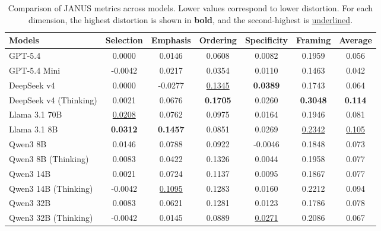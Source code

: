 \documentclass[11pt]{article}
\begin{document}
\begin{table}[t]
\centering
\small
\begin{tabular}{lcccccc}
\toprule
Models & Selection & Emphasis & Ordering & Specificity & Framing &  Average \\
\midrule
GPT-5.4 & 0.0000 & 0.0146 & \cellcolor{janusTeal!40}0.0608 & 0.0082 & \cellcolor{janusTeal!45}0.1959 & 0.056 \\
GPT-5.4 Mini & -0.0042 & 0.0217 & 0.0354 & 0.0110 & \cellcolor{janusTeal!45}0.1463 & 0.042 \\
\midrule
DeepSeek v4 & 0.0000 & -0.0277 & \cellcolor{janusTeal!45}\underline{0.1345} & \cellcolor{janusTeal!38}\textbf{0.0389} & \cellcolor{janusTeal!45}0.1743 & 0.064 \\
DeepSeek v4 (Thinking) & 0.0021 & \cellcolor{janusTeal!35}0.0676 & \cellcolor{janusTeal!45}\textbf{0.1705} & \cellcolor{janusTeal!14}0.0260 & \cellcolor{janusTeal!45}\textbf{0.3048} & \textbf{0.114} \\

\midrule
Llama 3.1 70B & \underline{0.0208} & \cellcolor{janusTeal!45}0.0762 & \cellcolor{janusTeal!45}0.0975 & 0.0164 & \cellcolor{janusTeal!45}0.1946 & 0.081 \\
Llama 3.1 8B & \cellcolor{janusTeal!26}\textbf{0.0312} & \cellcolor{janusTeal!45}\textbf{0.1457} & \cellcolor{janusTeal!45}0.0851 & 0.0269 & \cellcolor{janusTeal!45}\underline{0.2342} & \underline{0.105} \\
\midrule
Qwen3 8B & 0.0146 & \cellcolor{janusTeal!43}0.0788 & \cellcolor{janusTeal!45}0.0922 & -0.0046 & \cellcolor{janusTeal!45}0.1848 & 0.073 \\
Qwen3 8B (Thinking) & 0.0083 & 0.0422 & \cellcolor{janusTeal!45}0.1326 & 0.0044 & \cellcolor{janusTeal!45}0.1958 & 0.077 \\
Qwen3 14B & 0.0021 & \cellcolor{janusTeal!45}0.0724 & \cellcolor{janusTeal!45}0.1137 & 0.0095 & \cellcolor{janusTeal!45}0.1867 & 0.077 \\
Qwen3 14B (Thinking) & -0.0042 & \cellcolor{janusTeal!45}\underline{0.1095} & \cellcolor{janusTeal!45}0.1283 & 0.0160 & \cellcolor{janusTeal!45}0.2212 & 0.094 \\
Qwen3 32B & 0.0083 & \cellcolor{janusTeal!43}0.0621 & \cellcolor{janusTeal!45}0.1281 & 0.0123 & \cellcolor{janusTeal!45}0.1786 & 0.078 \\
Qwen3 32B (Thinking) & -0.0042 & 0.0145 & \cellcolor{janusTeal!45}0.0889 & \underline{0.0271} & \cellcolor{janusTeal!45}0.2086 & 0.067 \\


\bottomrule

\end{tabular}
\caption{Comparison of JANUS metrics across models. Lower values correspond to lower distortion. For each dimension, the highest distortion is shown in \textbf{bold}, and the second-highest is \underline{underlined}.}
\label{tab:janus-model-core-metrics-absolute}

\end{table}
\end{document}
